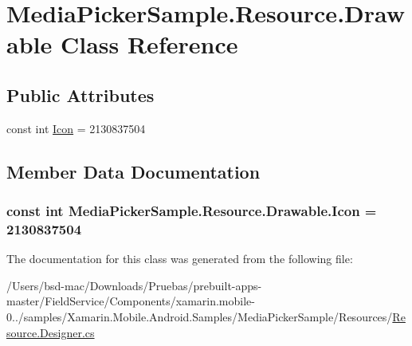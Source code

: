 \hypertarget{class_media_picker_sample_1_1_resource_1_1_drawable}{\section{Media\+Picker\+Sample.\+Resource.\+Drawable Class Reference}
\label{class_media_picker_sample_1_1_resource_1_1_drawable}
}
\subsection*{Public Attributes}
\begin{DoxyCompactItemize}
\item 
const int \hyperlink{class_media_picker_sample_1_1_resource_1_1_drawable_a6dccec24fe8c3fa191f0696f29064e48}{Icon} = 2130837504
\end{DoxyCompactItemize}


\subsection{Member Data Documentation}
\hypertarget{class_media_picker_sample_1_1_resource_1_1_drawable_a6dccec24fe8c3fa191f0696f29064e48}{
\subsubsection[{Icon}]{\setlength{\rightskip}{0pt plus 5cm}const int Media\+Picker\+Sample.\+Resource.\+Drawable.\+Icon = 2130837504}}\label{class_media_picker_sample_1_1_resource_1_1_drawable_a6dccec24fe8c3fa191f0696f29064e48}


The documentation for this class was generated from the following file\+:\begin{DoxyCompactItemize}
\item 
/\+Users/bsd-\/mac/\+Downloads/\+Pruebas/prebuilt-\/apps-\/master/\+Field\+Service/\+Components/xamarin.\+mobile-\/0../samples/\+Xamarin.\+Mobile.\+Android.\+Samples/\+Media\+Picker\+Sample/\+Resources/\hyperlink{_components_2xamarin_8mobile-0_86_81_2samples_2_xamarin_8_mobile_8_android_8_samples_2_media_picb4289798373573612b81d1923e7d12fa}{Resource.\+Designer.\+cs}\end{DoxyCompactItemize}
